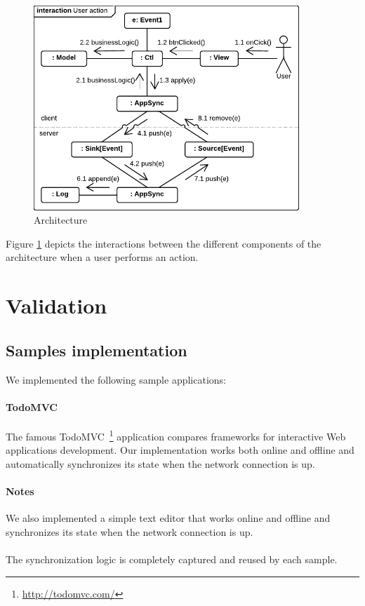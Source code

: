 \documentclass{llncs}
\begin{document}
\begin{figure}
\centering
\includegraphics[width=10cm]{communication.pdf}
\caption{Architecture}
\label{fig-communication}
\end{figure}

Figure \ref{fig-communication} depicts the interactions between the different components of the architecture when a user performs an action.

\section{Validation}

\subsection{Samples implementation}

We implemented the following sample applications:

\paragraph{TodoMVC} The famous TodoMVC~\footnote{\href{http://todomvc.com/}{http://todomvc.com/}} application compares frameworks for interactive Web applications development. Our implementation works both online and offline and automatically synchronizes its state when the network connection is up.

\paragraph{Notes} We also implemented a simple text editor that works online and offline and synchronizes its state when the network connection is up.

\paragraph{}The synchronization logic is completely captured and reused by each sample.
\end{document}

